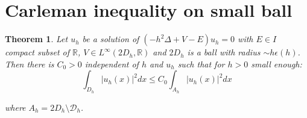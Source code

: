 \documentclass[leqno,11pt,letterpaper, english]{amsart}
\newcommand{\D}{{\mathcal D}}
\theoremstyle{plain}
\newtheorem{thm}{Theorem}
\theoremstyle{definition}
\numberwithin{equation}{section}
\def\R{\mathbb R}
\begin{document}
\section{Carleman inequality on small ball}
\label{subsect: AP_Carl_small}
\begin{thm}
	Let $u_h$ be a solution of $(-h^2\Delta + V - E)u_h = 0$ with $E \in I$ compact subset of $\mathbb{R}$, $V \in L^\infty(2D_h,\R)$ and $2D_h$ is a ball with radius $\sim h\epsilon(h)$. Then there is $C_0 > 0$ independent of $h$ and $u_h$ such that for $h > 0$ small enough:
	\begin{equation}
		\int_{D_{h}} |u_h(x)|^2dx \leq C_0 \int_{A_{h}} |u_h(x)|^2dx 
	\end{equation}
	
	where $A_{h} = 2D_{h} \setminus \D_{h}$.
	\end{thm}
	
\end{document}
